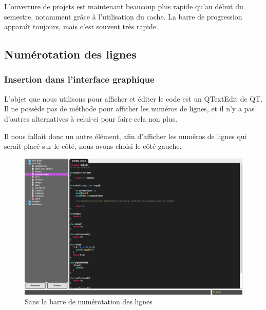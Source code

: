 \documentclass[a4paper,12pt]{article}
\begin{document}
		L'ouverture de projets est maintenant beaucoup plus rapide qu'au début du semestre, notamment grâce à l'utilisation du cache. La barre de progression apparaît toujours, mais c'est souvent très rapide.
		
	\subsection{Numérotation des lignes}
	
		\subsubsection{Insertion dans l'interface graphique}

	L'objet que nous utilisons pour afficher et éditer le code est un QTextEdit de QT. Il ne possède pas de méthode pour afficher les numéros de lignes, et il n'y a pas d'autres alternatives à celui-ci pour faire cela non plus.
	
	Il nous fallait donc un autre élément, afin d'afficher les numéros de lignes qui serait placé sur le côté, nous avons choisi le côté gauche.
	
		\begin{figure}[h!]
			\begin{center}
				\includegraphics[scale=0.2]{images/imgs_lines/avant}
				\caption{Sans la barre de numérotation des lignes}
			\end{center}
		\end{figure}
		
\end{document}
